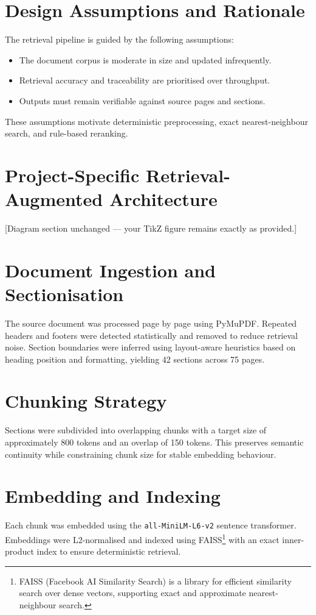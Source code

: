 \documentclass[12pt,a4paper]{report}
\begin{document}
\section{Design Assumptions and Rationale}
The retrieval pipeline is guided by the following assumptions:
\begin{itemize}
  \item The document corpus is moderate in size and updated infrequently.
  \item Retrieval accuracy and traceability are prioritised over throughput.
  \item Outputs must remain verifiable against source pages and sections.
\end{itemize}

These assumptions motivate deterministic preprocessing, exact nearest-neighbour search, and rule-based reranking.

\section{Project-Specific Retrieval-Augmented Architecture}
[Diagram section unchanged — your TikZ figure remains exactly as provided.]

\section{Document Ingestion and Sectionisation}
The source document was processed page by page using PyMuPDF. Repeated headers and footers were detected statistically and removed to reduce retrieval noise. Section boundaries were inferred using layout-aware heuristics based on heading position and formatting, yielding 42 sections across 75 pages.

\section{Chunking Strategy}
Sections were subdivided into overlapping chunks with a target size of approximately 800 tokens and an overlap of 150 tokens. This preserves semantic continuity while constraining chunk size for stable embedding behaviour.

\section{Embedding and Indexing}
Each chunk was embedded using the \texttt{all-MiniLM-L6-v2} sentence transformer. Embeddings were L2-normalised and indexed using FAISS\footnote{FAISS (Facebook AI Similarity Search) is a library for efficient similarity search over dense vectors, supporting exact and approximate nearest-neighbour search.} with an exact inner-product index to ensure deterministic retrieval.
\end{document}
